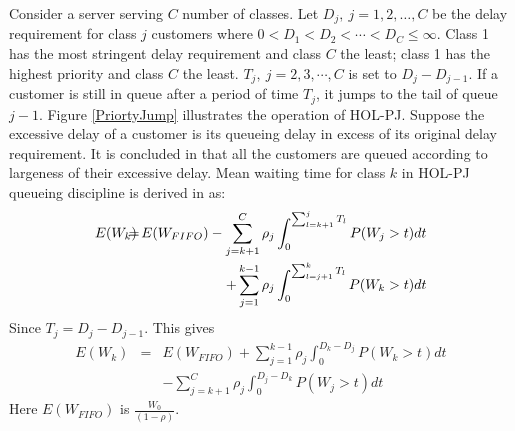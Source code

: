\documentclass[letterpaper, 10 pt, conference]{ieeeconf}  %
\begin{document}
Consider a server serving $C$ number of classes. Let $D_j,~j=1,2,\ldots,C$ be the delay requirement for class $j$ customers where $0<D_1<D_2<\cdots<D_C\leq \infty$. Class 1 has the most stringent delay requirement and class $C$ the least; class 1 has the highest priority and class $C$ the least. $T_j,~j=2,3,\cdots, C$ is set to $D_j - D_{j-1}$. If a customer is still in queue after a period of time $T_j$, it jumps to the tail of queue $j-1$. Figure \ref{PriortyJump} illustrates the operation of HOL-PJ. Suppose the excessive delay of a customer is its queueing delay in excess of its original delay requirement. It is concluded in \cite{holpj} that all the customers are queued according to largeness of their excessive delay. Mean waiting time for class $k$ in HOL-PJ queueing discipline is derived in \cite{holpj} as:
\begin{eqnarray}\nonumber
E(W_k)\hspace{-0,12in} &=&\hspace{-0,12in} E(W_{FIFO}) - \sum_{j =k+1}^C \rho_j \int_0^{\sum_{l = k+1}^jT_l}P(W_j > t)dt \\
&&+ \sum_{j=1}^{k-1}\rho_j\int_{0}^{\sum_{l = j+1}^k T_l}P(W_k > t)dt
\end{eqnarray}
Since $T_j = D_j -D_{j-1}$. This gives 
\begin{eqnarray}\nonumber
E(W_k)& =& E(W_{FIFO}) + \sum_{j=1}^{k-1}\rho_j\int_{0}^{D_k - D_j}P(W_k > t)dt\\\label{eqn:holpj_recursion}
&& - \sum_{j =k+1}^C \rho_j \int_0^{D_j-D_k}P(W_j > t)dt
\end{eqnarray}
Here $E(W_{FIFO})$ is $\frac{W_0}{(1-\rho)}$.
\end{document}
